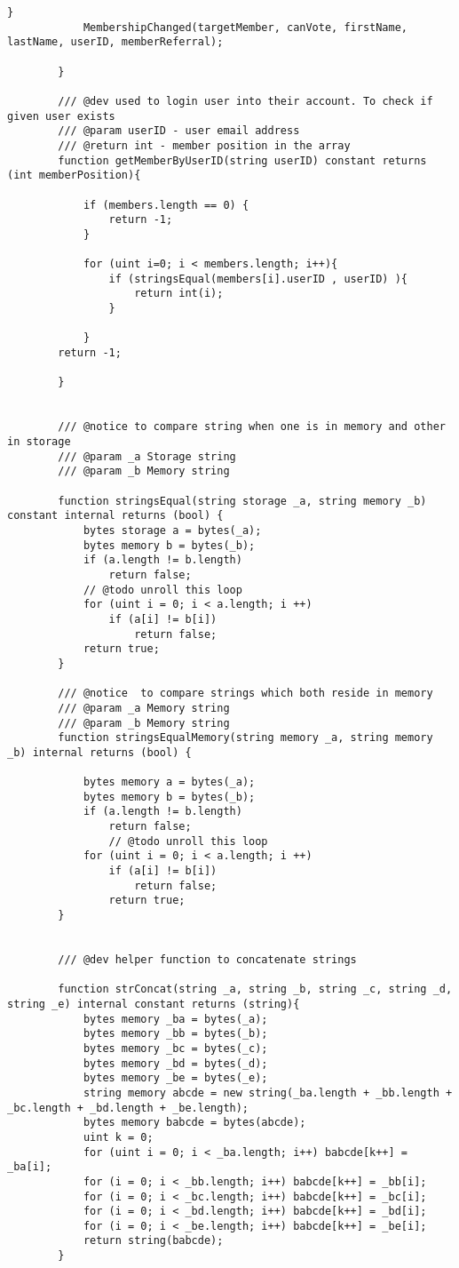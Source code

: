 \documentclass{article}
\begin{document}
\begin{lstlisting}[style=MyCStyle]
            }
            MembershipChanged(targetMember, canVote, firstName, lastName, userID, memberReferral);

        }

        /// @dev used to login user into their account. To check if given user exists
        /// @param userID - user email address
        /// @return int - member position in the array
        function getMemberByUserID(string userID) constant returns (int memberPosition){

            if (members.length == 0) {
                return -1;
            }

            for (uint i=0; i < members.length; i++){
                if (stringsEqual(members[i].userID , userID) ){
                    return int(i);
                }

            }
        return -1;

        }


        /// @notice to compare string when one is in memory and other in storage
        /// @param _a Storage string
        /// @param _b Memory string

        function stringsEqual(string storage _a, string memory _b) constant internal returns (bool) {
		    bytes storage a = bytes(_a);
		    bytes memory b = bytes(_b);
		    if (a.length != b.length)
			    return false;
		    // @todo unroll this loop
		    for (uint i = 0; i < a.length; i ++)
			    if (a[i] != b[i])
				    return false;
		    return true;
	    }

        /// @notice  to compare strings which both reside in memory
        /// @param _a Memory string
        /// @param _b Memory string
        function stringsEqualMemory(string memory _a, string memory _b) internal returns (bool) {

            bytes memory a = bytes(_a);
            bytes memory b = bytes(_b);
            if (a.length != b.length)
                return false;
                // @todo unroll this loop
            for (uint i = 0; i < a.length; i ++)
                if (a[i] != b[i])
                    return false;
                return true;
        }


        /// @dev helper function to concatenate strings

        function strConcat(string _a, string _b, string _c, string _d, string _e) internal constant returns (string){
            bytes memory _ba = bytes(_a);
            bytes memory _bb = bytes(_b);
            bytes memory _bc = bytes(_c);
            bytes memory _bd = bytes(_d);
            bytes memory _be = bytes(_e);
            string memory abcde = new string(_ba.length + _bb.length + _bc.length + _bd.length + _be.length);
            bytes memory babcde = bytes(abcde);
            uint k = 0;
            for (uint i = 0; i < _ba.length; i++) babcde[k++] = _ba[i];
            for (i = 0; i < _bb.length; i++) babcde[k++] = _bb[i];
            for (i = 0; i < _bc.length; i++) babcde[k++] = _bc[i];
            for (i = 0; i < _bd.length; i++) babcde[k++] = _bd[i];
            for (i = 0; i < _be.length; i++) babcde[k++] = _be[i];
            return string(babcde);
        }


\end{lstlisting}
\end{document}
